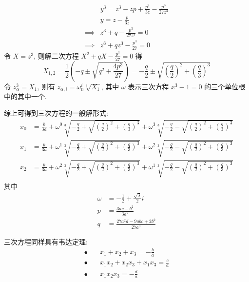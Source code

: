 \[ \begin{aligned}
    & y^3 = z^3 - zp + \frac{p^2}{3z} - \frac{p^3}{27z^3} \\
    & y = z - \frac{p}{3z} \\
    \implies & z^3 + q - \frac{p^3}{27z^3} = 0 \\
    \implies & z^6 + qz^3 - \frac{p^3}{27} = 0
\end{aligned} \]
令 $X = z^3$, 则解二次方程 $X^2 + qX - \frac{p^3}{27} = 0$ 得
\[
X_{1, 2} = \frac12 (-q \pm \sqrt{q^2 + \frac{4p^3}{27}}) = -\frac{q}{2} \pm \sqrt{(\frac{q}{2})^2 + (\frac{q}{3})^3}
\]
令 $z_\alpha^3 = X_1$, 则有 $z_{\alpha, i} = \omega^i_0 \sqrt[3]{X_1}$, 其中 $\omega$ 表示三次方程 $x^3-1 = 0$ 的三个单位根中的其中一个.

综上可得到三次方程的一般解形式:
\[ \begin{aligned}
    x_0 &= \frac{b}{3a} + \omega^{0} \sqrt[3]{-\frac{q}{2}+\sqrt{(\frac{q}{2})^2 + (\frac{q}{3})^3}} + \omega^{3} \sqrt[3]{-\frac{q}{2}-\sqrt{(\frac{q}{2})^2 + (\frac{q}{3})^3}} \\
    x_1 &= \frac{b}{3a} + \omega^{1} \sqrt[3]{-\frac{q}{2}+\sqrt{(\frac{q}{2})^2 + (\frac{q}{3})^3}} + \omega^{2} \sqrt[3]{-\frac{q}{2}-\sqrt{(\frac{q}{2})^2 + (\frac{q}{3})^3}} \\
    x_2 &= \frac{b}{3a} + \omega^{2} \sqrt[3]{-\frac{q}{2}+\sqrt{(\frac{q}{2})^2 + (\frac{q}{3})^3}} + \omega^{1} \sqrt[3]{-\frac{q}{2}-\sqrt{(\frac{q}{2})^2 + (\frac{q}{3})^3}} \\   
\end{aligned} \]
其中
\[ \begin{aligned}
\omega &= -\frac{1}{2} + \frac{\sqrt{3}}{2} i \\
p &= \frac{3ac-b^2}{3a^2} \\
q &= \frac{27a^2d - 9abc + 2b^2}{27a^3}
\end{aligned} \]

三次方程同样具有韦达定理:
\[ \begin{aligned}
\bullet \quad & x_1 + x_2 + x_3 = -\frac{b}{a} \\
\bullet \quad & x_1 x_2 + x_2 x_3 + x_1 x_3 = \frac{c}{a} \\
\bullet \quad & x_1 x_2 x_3 = -\frac{d}{a} \\
\end{aligned} \]
\endinput